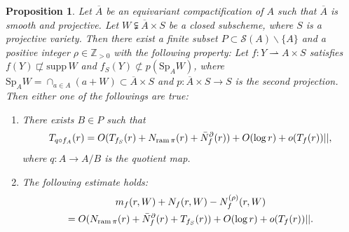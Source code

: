 \documentclass[11pt,english]{smfart}
\theoremstyle{plain}
\newtheorem{proposition}[thm]{Proposition}
\theoremstyle{definition}
\theoremstyle{remark}
\numberwithin{equation}{section}
\theoremstyle{plain}
\newcommand{\da}{\rightharpoonup}
\newcommand{\pN}[1]{\bar{N}_{#1}^{\partial}}
\newcommand{\ram}{{\rm ram}\,}
\begin{document}
	
	\begin{proposition}\label{pro:202208062}
		Let $\overline{A}$ be an equivariant compactification of $A$ such that $\overline{A}$ is smooth and projective.
		Let $W\subsetneqq \overline{A}\times S$ be a closed subscheme, where $S$ is a projective variety.
		Then there exist a finite subset $P\subset \mathcal{S}(A)\backslash\{A\}$ and a positive integer $\rho\in\mathbb Z_{>0}$ with the following property:
		Let $f:Y\da A\times S$ satisfies $f(Y)\not\sqsubset \mathrm{supp}\, W$ and $f_S(Y)\not\subset p(\mathrm{Sp}_AW)$, where $\mathrm{Sp}_AW=\cap_{a\in A}(a+W)\subset \overline{A}\times S$ and $p:\overline{A}\times S\to S$ is the second projection.
		Then either one of the followings are true:
		\begin{enumerate}
			\item
			There exists $B\in P$ such that
			$$T_{q\circ f_A}(r)=O(T_{f_S}(r)+N_{\ram\pi}(r)+\pN{f}(r))+O(\log r)+o(T_{f}(r))||,$$
			where $q:A\to A/B$ is the quotient map.
			\item
			The following estimate holds:
			\begin{multline}
				m_f(r,W)+N_f(r,W)-N^{(\rho)}_f(r,W)\\
				=O(N_{\ram\pi}(r)
				+\pN{f}(r)+T_{f_S}(r))+O(\log r)+o(T_f(r))||.
			\end{multline}
		\end{enumerate}
	\end{proposition}
	
\end{document}
